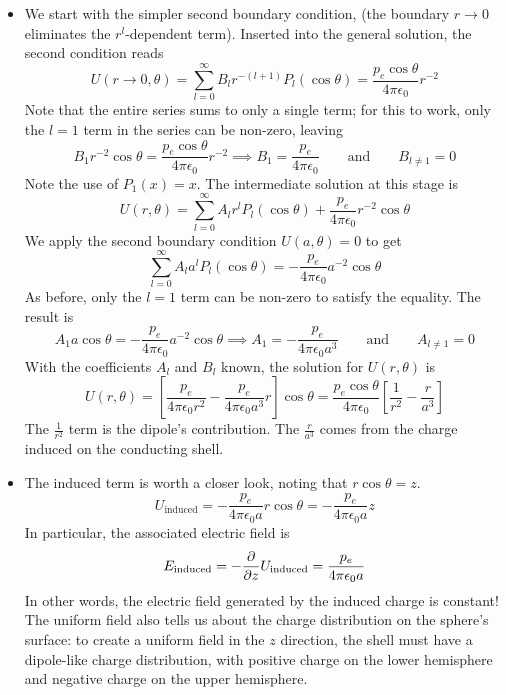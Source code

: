 \documentclass[11pt, a4paper]{article}
\newcommand{\eqtext}[1]{\qquad \text{#1} \qquad}
\newcommand{\e}{\epsilon_{0}} %
\begin{document}
\begin{itemize}
	\item We start with the simpler second boundary condition, (the boundary $ r \to 0 $ eliminates the $ r^{l} $-dependent term). Inserted into the general solution, the second condition reads
	\begin{equation*}
		U(r\to 0, \theta) = \sum_{l = 0}^{\infty} B_{l}r^{-(l+1)}P_{l}(\cos \theta) = \frac{p_{e}\cos \theta}{4\pi \e }r^{-2}
	\end{equation*}
	Note that the entire series sums to only a single term; for this to work, only the $ l = 1 $ term in the series can be non-zero, leaving
	\begin{equation*}
		B_{1}r^{-2}\cos \theta = \frac{p_{e}\cos \theta}{4\pi \e }r^{-2} \implies B_{1} = \frac{p_{e}}{4\pi \e} \eqtext{and} B_{l\neq 1} = 0
	\end{equation*}
	Note the use of $ P_{1}(x) = x $. The intermediate solution at this stage is
	\begin{equation*}
		U(r, \theta) = \sum_{l = 0}^{\infty} A_{l} r^{l} P_{l}(\cos \theta) + \frac{p_{e}}{4\pi \e}r^{-2} \cos \theta
	\end{equation*}
	We apply the second boundary condition $ U(a, \theta) = 0 $ to get
	\begin{equation*}
		\sum_{l = 0}^{\infty} A_{l} a^{l} P_{l}(\cos \theta) = - \frac{p_{e}}{4\pi \e}a^{-2} \cos \theta
	\end{equation*}
	As before, only the $ l = 1 $ term can be non-zero to satisfy the equality. The result is
	\begin{equation*}
		A_{1}a\cos \theta = - \frac{p_{e}}{4\pi \e}a^{-2} \cos \theta \implies A_{1} = -\frac{p_{e}}{4\pi \e a^{3}} \eqtext{and} A_{l\neq 1} = 0
	\end{equation*}
	With the coefficients $ A_{l} $ and $ B_{l} $ known, the solution for $ U(r, \theta) $ is
	\begin{equation*}
		U(r, \theta) = \left[\frac{p_{e}}{4\pi \e r^{2}} -\frac{p_{e}}{4\pi \e a^{3}}r\right]\cos \theta = \frac{p_{e}\cos \theta}{4\pi \e}\left[\frac{1}{r^{2}} - \frac{r}{a^{3}}\right]
	\end{equation*}
	The $ \frac{1}{r^{2}} $ term is the dipole's contribution. The $ \frac{r}{a^{3}} $ comes from the charge induced on the conducting shell. 
	
	\item The induced term is worth a closer look, noting that $ r\cos \theta = z $. 
	\begin{equation*}
		U_{\text{induced}} = -\frac{p_{e}}{4\pi \e a}r\cos \theta = -\frac{p_{e}}{4\pi \e a}z
	\end{equation*}
	In particular, the associated electric field is
	\begin{equation*}
		E_{\text{induced}} = -\pdv{z}U_{\text{induced}} = \frac{p_{e}}{4\pi \e a}
	\end{equation*}
	In other words, the electric field generated by the induced charge is constant! The uniform field also tells us about the charge distribution on the sphere's surface: to create a uniform field in the $ z $ direction, the shell must have a dipole-like charge distribution, with positive charge on the lower hemisphere and negative charge on the upper hemisphere. 
	

\end{itemize}
\end{document}
